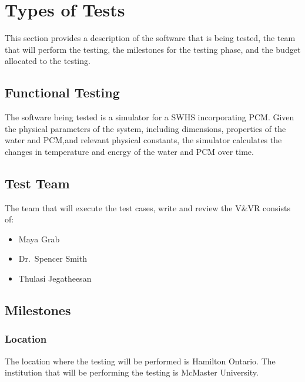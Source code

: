 \documentclass[12pt]{article}
\begin{document}
\section{Types of Tests}
This section provides a description of the software that is being tested, the team that will
perform the testing, the milestones for the testing phase, and the budget allocated to the testing. 

\subsection{Functional Testing}
The software being tested is a simulator for a SWHS
incorporating PCM. Given the physical parameters of the system,
 including dimensions, properties of the water and PCM,and relevant physical constants,
  the simulator calculates the changes in temperature and energy of the water and PCM 
  over time.

\subsection{Test Team} 
The team that will execute the test cases, write and review the V\&VR consists of:

\begin{itemize}
 \item Maya Grab 
 \item Dr.\ Spencer Smith
 \item Thulasi Jegatheesan 
\end{itemize}  

\subsection{Milestones}

\subsubsection{Location}
The location where the testing will be performed is Hamilton Ontario. The institution that
will be performing the testing is McMaster University. 


\end{document}
